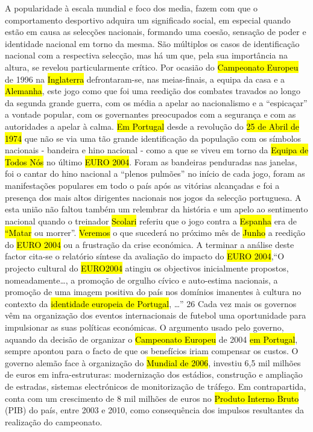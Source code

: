\documentclass[a4paper,12pt]{article}
\begin{document}
 A popularidade à escala mundial e foco dos media, fazem com que o comportamento desportivo adquira um significado social, em especial quando estão em causa as selecções nacionais, formando uma coesão, sensação de poder e identidade nacional em torno da mesma. São múltiplos os casos de identificação nacional com a respectiva selecção, mas há um que, pela sua importância na altura, se revelou particularmente crítico. Por ocasião do \hl{Campeonato Europeu} de 1996 na \hl{Inglaterra} defrontaram-se, nas meias-finais, a equipa da casa e a \hl{Alemanha}, este jogo como que foi uma reedição dos combates travados ao longo da segunda grande guerra, com os média a apelar ao nacionalismo e a “espicaçar” a vontade popular, com os governantes preocupados com a segurança e com as autoridades a apelar à calma.
 \hl{Em Portugal} desde a revolução do \hl{25 de Abril de 1974} que não se via uma tão grande identificação da população com os símbolos nacionais - bandeira e hino nacional - como a que se viveu em torno da \hl{Equipa de Todos Nós} no último \hl{EURO 2004}. Foram as bandeiras penduradas nas janelas, foi o cantar do hino nacional a “plenos pulmões” no início de cada jogo, foram as manifestações populares em todo o país após as vitórias alcançadas e foi a presença dos mais altos dirigentes nacionais nos jogos da selecção portuguesa. A esta união não faltou também um relembrar da história e um apelo ao sentimento nacional quando o treinador \hl{Scolari} referiu que o jogo contra a \hl{Espanha} era de \hl{“Matar} ou morrer”.
 \hl{Veremos} o que sucederá no próximo mês de \hl{Junho} a reedição do \hl{EURO 2004} ou a frustração da crise económica.
 A terminar a análise deste factor cita-se o relatório síntese da avaliação do impacto do \hl{EURO 2004},“O projecto cultural do \hl{EURO2004} atingiu os objectivos inicialmente propostos, nomeadamente…, a promoção de orgulho cívico e auto-estima nacionais, a promoção de uma imagem positiva do país nos domínios imanentes à cultura no contexto
 da \hl{identidade europeia de Portugal}, …” 26
 Cada vez mais os governos vêm na organização dos eventos internacionais de futebol uma oportunidade para impulsionar as suas políticas económicas. O argumento usado pelo governo, aquando da decisão de organizar o \hl{Campeonato Europeu} de 2004 \hl{em Portugal}, sempre apontou para o facto de que os benefícios iriam compensar os custos. O governo alemão face à organização do \hl{Mundial de 2006}, investiu 6,5 mil milhões de euros em infra-estruturas: modernização dos estádios, construção e ampliação de estradas, sistemas electrónicos de monitorização de tráfego. Em contrapartida, conta com um crescimento de 8 mil milhões de euros no \hl{Produto Interno Bruto} (PIB) do país, entre 2003 e 2010, como consequência dos impulsos resultantes da realização do campeonato.
\end{document}
